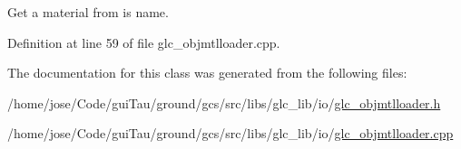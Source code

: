 Get a material from is name. 



Definition at line 59 of file glc\-\_\-objmtlloader.\-cpp.



The documentation for this class was generated from the following files\-:\begin{DoxyCompactItemize}
\item 
/home/jose/\-Code/gui\-Tau/ground/gcs/src/libs/glc\-\_\-lib/io/\hyperlink{glc__objmtlloader_8h}{glc\-\_\-objmtlloader.\-h}\item 
/home/jose/\-Code/gui\-Tau/ground/gcs/src/libs/glc\-\_\-lib/io/\hyperlink{glc__objmtlloader_8cpp}{glc\-\_\-objmtlloader.\-cpp}\end{DoxyCompactItemize}
